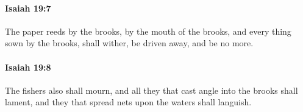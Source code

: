 		\paragraph{Isaiah 19:7} %
			\label{ISAIAH-19-7}

			The paper reeds by the brooks, by the mouth of the brooks, and every thing sown by the brooks, shall wither, be driven away, and be no more.


		\paragraph{Isaiah 19:8} %
			\label{ISAIAH-19-8}

			The fishers also shall mourn, and all they that cast angle into the brooks shall lament, and they that spread nets upon the waters shall languish.


